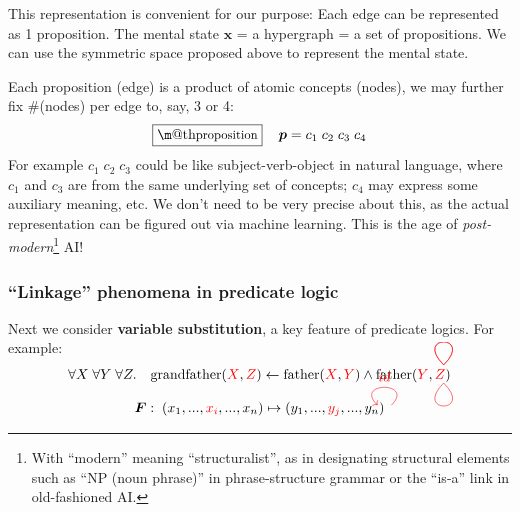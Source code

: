 \documentclass[orivec]{llncs}
\makeatletter
\newcommand{\vect}[1]{\boldsymbol{#1}}
\newcommand{\tikzmark}[1]{\tikz[overlay,remember picture] \node (#1) {};}
\renewcommand{\boxed}[1]{\fbox{\m@th$\displaystyle\scalebox{0.9}{#1}$} \,}
\makeatother
\begin{document}
This representation is convenient for our purpose:  Each edge can be represented as 1 proposition.  The mental state $\vect{x}$ = a hypergraph = a set of propositions.  We can use the symmetric space proposed above to represent the mental state.

Each proposition (edge) is a product of atomic concepts (nodes), we may further fix \#(nodes) per edge to, say, 3 or 4:
\begin{equation}
\boxed{\mbox{proposition}} \quad \vect{p} = c_1 \; c_2 \; c_3 \; c_4
\end{equation}
For example $c_1 \; c_2 \; c_3$ could be like subject-verb-object in natural language, where $c_1$ and $c_3$ are from the same underlying set of concepts;  $c_4$ may express some auxiliary meaning, etc.  We don't need to be very precise about this, as the actual representation can be figured out via machine learning.  This is the age of \textit{post-modern}\footnote{With ``modern'' meaning ``structuralist'', as in designating structural elements such as ``NP (noun phrase)'' in phrase-structure grammar or the ``is-a'' link in old-fashioned AI.} AI!

\subsubsection{``Linkage'' phenomena in predicate logic}

Next we consider \textbf{variable substitution}, a key feature of predicate logics.  For example:
\begin{equation}
\forall X \; \forall Y \; \forall Z.  \quad  \text{grandfather}({\color{red}X} \tikzmark{x}, {\color{red}Z} \tikzmark{z}) \leftarrow \text{father}({\color{red}X} \tikzmark{p}, {\color{red}Y} \tikzmark{y}) \wedge \mbox{father}({\color{red}Y} \tikzmark{q}, {\color{red}Z} \tikzmark{r})
\begin{tikzpicture}[overlay,remember picture,out=45,in=135,distance=1.1cm]
  \draw[-,red, transform canvas={shift={(-5pt,10pt)}}] (x.center) to (p.center);
  \draw[-,red, transform canvas={shift={(-5pt,10pt)}}] (y.center) to (q.center);
  \draw[-,red, transform canvas={shift={(-5pt,-3pt)}}, out=-45,in=225] (z.center) to (r.center);
\end{tikzpicture}
\label{linkage-father}
\end{equation}

\begin{equation}
\vect{F}: \; (x_1, ..., {\color{red} x_i} \tikzmark{a}, ... , x_n) \mapsto (y_1, ... , \tikzmark{b} {\color{red} y_j} , ... , y_n)
\begin{tikzpicture}[overlay,remember picture,out=45,in=135,distance=1.1cm]
  \draw[->,red,shorten >=7pt,shorten <=7pt] (a.center) to node [auto, above=2pt] {$id$} (b.center);
\end{tikzpicture}
\end{equation}
\end{document}
